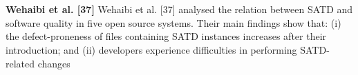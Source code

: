 \\
\\
\textbf{Wehaibi et al. [37]}
Wehaibi et al. [37] analysed the relation between SATD and software quality in five open source systems. Their main findings show that: (i) the defect-proneness of files containing SATD instances increases after their introduction; and (ii) developers experience difficulties in performing SATD-related changes
\\
\\